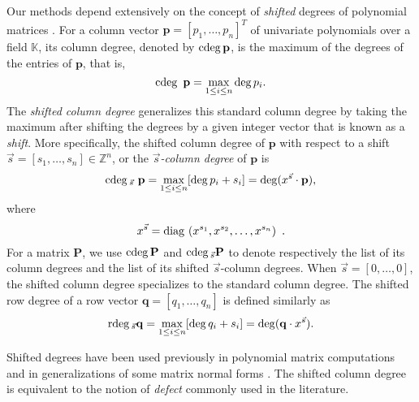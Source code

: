 Our methods depend extensively on the concept of {\em shifted}
degrees of polynomial matrices \cite{BLV:1999}. For a column vector
$\mathbf{p}=\left[p_{1},\dots,p_{n}\right]^{T}$ of univariate polynomials
over a field $\mathbb{K}$, its column degree, denoted by ${\rm cdeg}\,\mathbf{p}$,
is the maximum of the degrees of the entries of $\mathbf{p}$, that
is, 
\[
{\rm cdeg}\,~\mathbf{p}=\max_{1\le i\le n}\deg p_{i}.
\]
The \emph{shifted column degree} generalizes this standard column
degree by taking the maximum after shifting the degrees by a given
integer vector that is known as a \emph{shift}. More specifically,
the shifted column degree of $\mathbf{p}$ with respect to a shift
$\vec{s}=\left[s_{1},\dots,s_{n}\right]\in\mathbb{Z}^{n}$, or the
\emph{$\vec{s}$-column degree} of $\mathbf{p}$ is 
\[
{\rm cdeg}\,_{\vec{s}}~\mathbf{p}=\max_{1\le i\le n}[\deg p_{i}+s_{i}]=\deg(x^{\vec{s}}\cdot\mathbf{p}),
\]
where 
\[
x^{\vec{s}}={\rm diag}\,\left(x^{s_{1}},x^{s_{2}},\dots,x^{s_{n}}\right) ~.
\]
For a matrix $\mathbf{P}$, we use ${\rm cdeg}\,\mathbf{P}$ and ${\rm cdeg}\,_{\vec{s}}\mathbf{P}$
to denote respectively the list of its column degrees and the list
of its shifted $\vec{s}$-column degrees. When $\vec{s}=\left[0,\dots,0\right]$,
the shifted column degree specializes to the standard column degree.
The shifted row degree of a row vector \textbf{$\mathbf{q}=\left[q_{1},\dots,q_{n}\right]$}
is defined similarly as 
\[
{\rm rdeg}\,_{\vec{s}}\mathbf{q}=\max_{1\le i\le n}[\deg q_{i}+s_{i}]=\deg(\mathbf{q}\cdot x^{\vec{s}}).
\]


Shifted degrees have been used previously in polynomial matrix
computations and in generalizations of some matrix normal forms \cite{BLV:jsc06}.
The shifted column degree is equivalent to the notion of \emph{defect}
commonly used in the literature.

